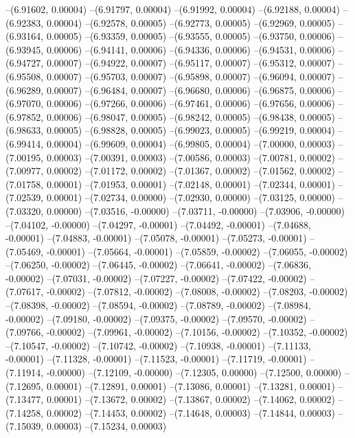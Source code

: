 --(6.91602, 0.00004)
--(6.91797, 0.00004)
--(6.91992, 0.00004)
--(6.92188, 0.00004)
--(6.92383, 0.00004)
--(6.92578, 0.00005)
--(6.92773, 0.00005)
--(6.92969, 0.00005)
--(6.93164, 0.00005)
--(6.93359, 0.00005)
--(6.93555, 0.00005)
--(6.93750, 0.00006)
--(6.93945, 0.00006)
--(6.94141, 0.00006)
--(6.94336, 0.00006)
--(6.94531, 0.00006)
--(6.94727, 0.00007)
--(6.94922, 0.00007)
--(6.95117, 0.00007)
--(6.95312, 0.00007)
--(6.95508, 0.00007)
--(6.95703, 0.00007)
--(6.95898, 0.00007)
--(6.96094, 0.00007)
--(6.96289, 0.00007)
--(6.96484, 0.00007)
--(6.96680, 0.00006)
--(6.96875, 0.00006)
--(6.97070, 0.00006)
--(6.97266, 0.00006)
--(6.97461, 0.00006)
--(6.97656, 0.00006)
--(6.97852, 0.00006)
--(6.98047, 0.00005)
--(6.98242, 0.00005)
--(6.98438, 0.00005)
--(6.98633, 0.00005)
--(6.98828, 0.00005)
--(6.99023, 0.00005)
--(6.99219, 0.00004)
--(6.99414, 0.00004)
--(6.99609, 0.00004)
--(6.99805, 0.00004)
--(7.00000, 0.00003)
--(7.00195, 0.00003)
--(7.00391, 0.00003)
--(7.00586, 0.00003)
--(7.00781, 0.00002)
--(7.00977, 0.00002)
--(7.01172, 0.00002)
--(7.01367, 0.00002)
--(7.01562, 0.00002)
--(7.01758, 0.00001)
--(7.01953, 0.00001)
--(7.02148, 0.00001)
--(7.02344, 0.00001)
--(7.02539, 0.00001)
--(7.02734, 0.00000)
--(7.02930, 0.00000)
--(7.03125, 0.00000)
--(7.03320, 0.00000)
--(7.03516, -0.00000)
--(7.03711, -0.00000)
--(7.03906, -0.00000)
--(7.04102, -0.00000)
--(7.04297, -0.00001)
--(7.04492, -0.00001)
--(7.04688, -0.00001)
--(7.04883, -0.00001)
--(7.05078, -0.00001)
--(7.05273, -0.00001)
--(7.05469, -0.00001)
--(7.05664, -0.00001)
--(7.05859, -0.00002)
--(7.06055, -0.00002)
--(7.06250, -0.00002)
--(7.06445, -0.00002)
--(7.06641, -0.00002)
--(7.06836, -0.00002)
--(7.07031, -0.00002)
--(7.07227, -0.00002)
--(7.07422, -0.00002)
--(7.07617, -0.00002)
--(7.07812, -0.00002)
--(7.08008, -0.00002)
--(7.08203, -0.00002)
--(7.08398, -0.00002)
--(7.08594, -0.00002)
--(7.08789, -0.00002)
--(7.08984, -0.00002)
--(7.09180, -0.00002)
--(7.09375, -0.00002)
--(7.09570, -0.00002)
--(7.09766, -0.00002)
--(7.09961, -0.00002)
--(7.10156, -0.00002)
--(7.10352, -0.00002)
--(7.10547, -0.00002)
--(7.10742, -0.00002)
--(7.10938, -0.00001)
--(7.11133, -0.00001)
--(7.11328, -0.00001)
--(7.11523, -0.00001)
--(7.11719, -0.00001)
--(7.11914, -0.00000)
--(7.12109, -0.00000)
--(7.12305, 0.00000)
--(7.12500, 0.00000)
--(7.12695, 0.00001)
--(7.12891, 0.00001)
--(7.13086, 0.00001)
--(7.13281, 0.00001)
--(7.13477, 0.00001)
--(7.13672, 0.00002)
--(7.13867, 0.00002)
--(7.14062, 0.00002)
--(7.14258, 0.00002)
--(7.14453, 0.00002)
--(7.14648, 0.00003)
--(7.14844, 0.00003)
--(7.15039, 0.00003)
--(7.15234, 0.00003)
